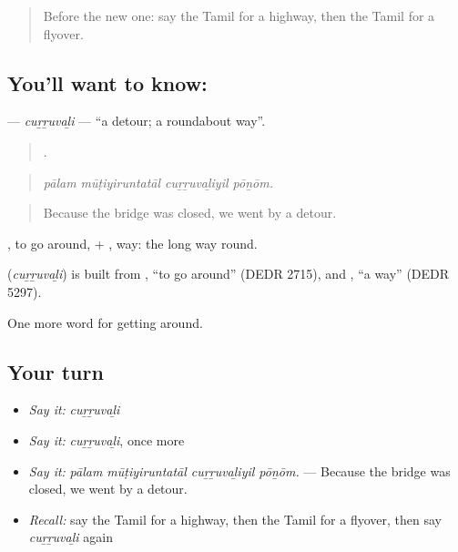 \label{lesson:TA-C403-curruvali}



\begin{quote}
Before the new one: say the Tamil for a highway, then the Tamil for a flyover.
\end{quote}

\subsection*{You'll want to know: }
\textbf{} — \emph{cuṟṟuvaḻi} — \textquotedblleft{}a detour; a roundabout way\textquotedblright{}.

\begin{quote}
   .
\end{quote}

\begin{quote}
\emph{pālam mūṭiyiruntatāl cuṟṟuvaḻiyil pōṉōm.}
\end{quote}

\begin{quote}
Because the bridge was closed, we went by a detour.
\end{quote}

, to go around, + , way: the long way round.

\begin{cousinweb}
\textbf{} (\emph{cuṟṟuvaḻi}) is built from , \textquotedblleft{}to go around\textquotedblright{} (DEDR 2715), and , \textquotedblleft{}a way\textquotedblright{} (DEDR 5297).
\end{cousinweb}

\begin{grammarlens}[title={What you've built}]
One more word for getting around.
\end{grammarlens}

\subsection*{Your turn}
\begin{itemize}
\raggedright
  \item \emph{Say it:} \emph{cuṟṟuvaḻi}
  \item \emph{Say it:} \emph{cuṟṟuvaḻi}, once more
  \item \emph{Say it:} \emph{pālam mūṭiyiruntatāl cuṟṟuvaḻiyil pōṉōm.} — Because the bridge was closed, we went by a detour.
  \item \emph{Recall:} say the Tamil for a highway, then the Tamil for a flyover, then say \emph{cuṟṟuvaḻi} again
\end{itemize}

